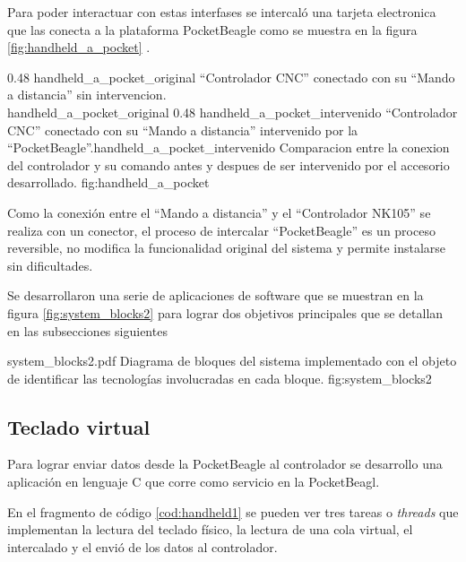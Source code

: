    Para poder interactuar con estas interfases se intercaló una tarjeta electronica que las conecta a la plataforma PocketBeagle como se muestra en la figura \ref{fig:handheld_a_pocket} .\par

\subfigab 
{0.48} {handheld_a_pocket_original} { ``Controlador CNC'' conectado con su ``Mando a distancia'' sin intervencion.\\ \vphantom{1}}{handheld_a_pocket_original}
{0.48} {handheld_a_pocket_intervenido} {``Controlador CNC'' conectado con su ``Mando a distancia'' intervenido por la\\ ``PocketBeagle''.}{handheld_a_pocket_intervenido}
   {Comparacion entre la conexion del controlador y su comando antes y despues de ser intervenido por el accesorio desarrollado.}
   {fig:handheld_a_pocket}

         Como la conexión entre el ``Mando a distancia'' y el ``Controlador NK105'' se realiza con un conector, el proceso de intercalar ``PocketBeagle'' es un proceso reversible, no modifica la funcionalidad original del sistema y permite instalarse sin dificultades.\par

   Se desarrollaron una serie de aplicaciones de software que se muestran en la figura \ref{fig:system_blocks2} para lograr dos objetivos principales que se detallan en las subsecciones siguientes

         {system_blocks2.pdf}
         {Diagrama de bloques del sistema implementado con el objeto de identificar las tecnologías involucradas en cada bloque.}
         {fig:system_blocks2}

\subsection{Teclado virtual}

      Para lograr enviar datos desde la PocketBeagle al controlador se desarrollo una aplicación en lenguaje C que corre como servicio en la PocketBeagl.\par
      En el fragmento de código \ref{cod:handheld1} se pueden ver tres tareas o \textit{threads} que implementan la lectura del teclado físico, la lectura de una cola virtual, el intercalado y el envió de los datos al controlador.\par

